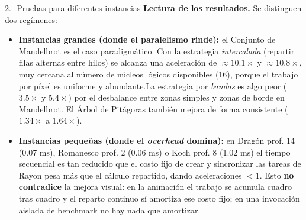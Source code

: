 \begin{respuesta}{2.- Pruebas para diferentes instancias}
    \textbf{Lectura de los resultados.} Se distinguen dos regímenes:

    \begin{itemize}
        \item \textbf{Instancias grandes (donde el paralelismo rinde):} el Conjunto de Mandelbrot es el caso paradigmático. Con la estrategia \textit{intercalada} (repartir filas alternas entre hilos) se alcanza una aceleración de
        $\approx 10.1\times$ y $\approx 10.8\times$, muy cercana al número de núcleos lógicos disponibles (16), porque el trabajo por píxel es uniforme y abundante.La estrategia por \textit{bandas} es algo peor ($3.5\times$ y $5.4\times$) por el
        desbalance entre zonas simples y zonas de borde en Mandelbrot. El Árbol de Pitágoras también mejora de forma consistente ($1.34\times$ a $1.64\times$).

        \item \textbf{Instancias pequeñas (donde el \textit{overhead} domina):} en Dragón prof. 14 (0.07 ms), Romanesco prof. 2 (0.06 ms) o Koch prof. 8 (1.02 ms) el tiempo secuencial es tan reducido que el costo fijo de crear y sincronizar las
        tareas de Rayon pesa más que el cálculo repartido, dando aceleraciones $< 1$. Esto \textbf{no contradice} la mejora visual: en la animación el trabajo se acumula cuadro tras cuadro y el reparto continuo sí amortiza ese costo fijo; en una invocación aislada de benchmark no hay nada que amortizar.
    \end{itemize}

\end{respuesta}
